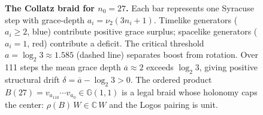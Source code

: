 \documentclass[11pt,a4paper]{article}
\theoremstyle{plain}
\theoremstyle{definition}
\theoremstyle{remark}
\numberwithin{equation}{section}
\newcommand{\Cl}{\mathbb{G}}
\newcommand{\Complex}{\mathbb{C}}
\begin{document}
\begin{figure}[ht]
{}
\caption{\textbf{The Collatz braid for $n_0=27$.}  Each bar
represents one Syracuse step with grace-depth $a_i=\nu_2(3n_i+1)$.
Timelike generators ($a_i\ge 2$, blue) contribute positive grace
surplus; spacelike generators ($a_i=1$, red) contribute a deficit.
The critical threshold $a=\log_2 3\approx 1.585$ (dashed line)
separates boost from rotation.  Over 111 steps the mean grace depth
$\overline{a}\approx 2$ exceeds $\log_2 3$, giving positive
structural drift $\delta=\overline{a}-\log_2 3>0$.  The ordered
product $B(27)=v_{a_{110}}\cdots v_{a_0}\in\Cl(1,1)$ is a legal
braid whose holonomy caps the center:
$\rho(B)\,W\in\Complex\,W$ and the Logos pairing is unit.}
\label{fig:collatz-braid-27}
\end{figure}
\end{document}
